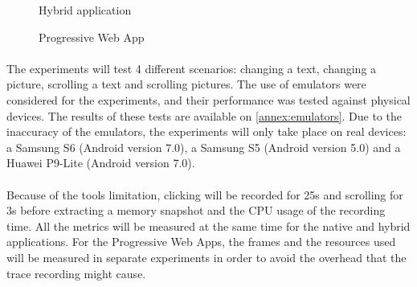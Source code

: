 \documentclass{kththesis}
\begin{document}
\begin{figure}
    \centering
    \hfill
    \hfill
    \hfill
    \hfill
    \caption{Hybrid application}
    \label{fig:hybrid_screens}
\end{figure}

\begin{figure}
    \centering
    \hfill
    \hfill
    \hfill
    \hfill
    \caption{Progressive Web App}
    \label{fig:pwa_screens}
\end{figure}

\paragraph{}
The experiments will test 4 different scenarios: changing a text, changing a picture, scrolling a text and scrolling pictures. The use of emulators were considered for the experiments, and their performance was tested against physical devices. The results of these tests are available on \autoref{annex:emulators}. Due to the inaccuracy of the emulators, the experiments will only take place on real devices: a Samsung S6 (Android version 7.0), a Samsung S5 (Android version 5.0) and a Huawei P9-Lite (Android version 7.0).
\paragraph{}
Because of the tools limitation, clicking will be recorded for 25s and scrolling for 3s before extracting a memory snapshot and the CPU usage of the recording time. All the metrics will be measured at the same time for the native and hybrid applications. For the Progressive Web Apps, the frames and the resources used will be measured in separate experiments in order to avoid the overhead that the trace recording might cause.
\end{document}
